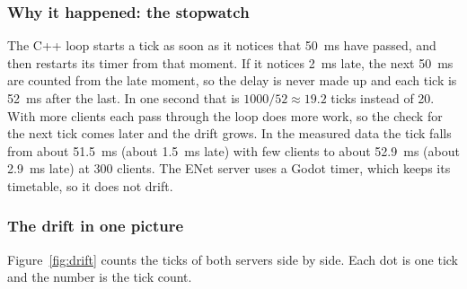 \documentclass[11pt]{article}
\begin{document}
\subsubsection{Why it happened: the stopwatch}
The C++ loop starts a tick as soon as it notices that 50~ms have passed, and then restarts its timer from that moment. If it notices 2~ms late, the next 50~ms are counted from the late moment, so the delay is never made up and each tick is 52~ms after the last. In one second that is $1000/52 \approx 19.2$ ticks instead of 20. With more clients each pass through the loop does more work, so the check for the next tick comes later and the drift grows. In the measured data the tick falls from about 51.5~ms (about 1.5~ms late) with few clients to about 52.9~ms (about 2.9~ms late) at 300 clients. The ENet server uses a Godot timer, which keeps its timetable, so it does not drift.

\subsubsection{The drift in one picture}
Figure~\ref{fig:drift} counts the ticks of both servers side by side. Each dot is one tick and the number is the tick count.
\end{document}
